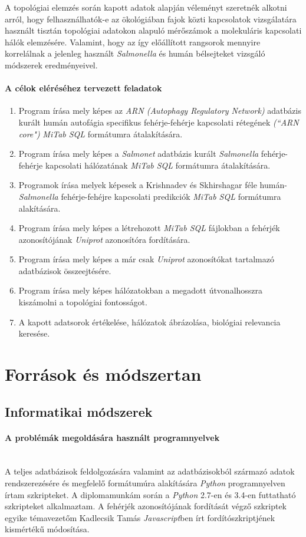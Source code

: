 \documentclass[a4paper,12pt]{article}
\begin{document}
	A topológiai elemzés során kapott adatok alapján véleményt szeretnék alkotni arról, hogy felhasználhatók-e az ökológiában fajok közti kapcsolatok vizsgálatára használt tisztán topológiai adatokon alapuló mérőszámok a molekuláris kapcsolati hálók elemzésére. Valamint, hogy az így előállított rangsorok mennyire korrelálnak a jelenleg használt \textit{Salmonella} és humán bélsejteket vizsgáló módszerek eredményeivel.

	\paragraph{A célok eléréséhez tervezett feladatok}
	\begin{enumerate}
		\item Program írása mely képes az \textit{ARN (Autophagy Regulatory Network)} adatbázis kurált humán autofágia specifikus fehérje-fehérje kapcsolati rétegének \textit{(``ARN core")} \textit{MiTab SQL} formátumra átalakítására.
		\item Program írása mely képes a \textit{Salmonet} adatbázis kurált \textit{Salmonella} fehérje-fehérje kapcsolati hálózatának \textit{MiTab SQL} formátumra átalakítására.
		\item Programok írása melyek képesek a Krishnadev és Skhirshagar féle humán-\textit{Salmonella} fehérje-fehéjre kapcsolati predikciók \textit{MiTab SQL} formátumra alakítására.
		\item Program írása mely képes a létrehozott \textit{MiTab SQL} fájlokban a fehérjék azonosítójának \textit{Uniprot} azonosítóra fordítására.
		\item Program írása mely képes a már csak \textit{Uniprot} azonosítókat tartalmazó adatbázisok összeejtésére.
		\item Program írása mely képes hálózatokban a megadott útvonalhosszra kiszámolni a topológiai fontosságot.
		\item A kapott adatsorok értékelése, hálózatok ábrázolása, biológiai relevancia keresése.
	\end{enumerate}
	\pagebreak

\section{Források és módszertan}

	\subsection{Informatikai módszerek}
			\paragraph{A problémák megoldására használt programnyelvek} \mbox{}\\
			A teljes adatbázisok feldolgozására valamint az adatbázisokból származó adatok rendszerezésére és megfelelő formátumúra alakítására \textit{Python} programnyelven írtam szkripteket. A diplomamunkám során a \textit{Python} 2.7-en és 3.4-en futtatható szkripteket alkalmaztam. A fehérjék azonosítójának fordítását végző szkriptek egyike témavezetőm Kadlecsik Tamás \textit{Javascript}ben írt fordítószkriptjének kismértékű módosítása.
			
\end{document}
